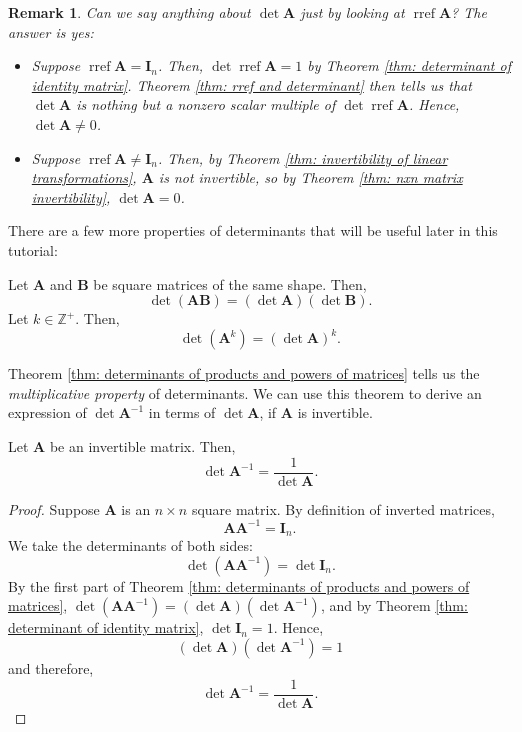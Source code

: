\documentclass[]{book}
\DeclareMathOperator{\rref}{rref}
\newcommand{\mat}[1]{\ensuremath{\mathbf{#1}}}
\newcommand{\idmat}[1][n]{\ensuremath{\mat{I}_#1}}
\newtheorem*{remark}{Remark}
\begin{document}
\begin{remark}
    Can we say anything about $\det\mat{A}$ just by looking at $\rref\mat{A}$? The answer is yes:
    \begin{itemize}
        \item Suppose $\rref\mat{A} = \idmat[n]$. Then, $\det\rref\mat{A} = 1$ by Theorem \ref{thm: determinant of identity matrix}. Theorem \ref{thm: rref and determinant} then tells us that $\det\mat{A}$ is nothing but a nonzero scalar multiple of $\det\rref\mat{A}$. Hence, $\det\mat{A} \neq 0$.
        \item Suppose $\rref\mat{A} \neq \idmat[n]$. Then, by Theorem \ref{thm: invertibility of linear transformations}, $\mat{A}$ is not invertible, so by Theorem \ref{thm: nxn matrix invertibility}, $\det\mat{A} = 0$.
    \end{itemize} 
\end{remark}

There are a few more properties of determinants that will be useful later in this tutorial:

\begin{theorem}
    \label{thm: determinants of products and powers of matrices}
    Let $\mat{A}$ and $\mat{B}$ be square matrices of the same shape. Then,
    \[\det(\mat{A}\mat{B}) = (\det\mat{A})(\det\mat{B}).\]
    Let $k \in \mathbb{Z}^+$. Then,
    \[\det(\mat{A}^k) = (\det\mat{A})^k.\]
\end{theorem}

Theorem \ref{thm: determinants of products and powers of matrices} tells us the \textit{multiplicative property} of determinants. We can use this theorem to derive an expression of $\det\mat{A}^{-1}$ in terms of $\det\mat{A}$, if $\mat{A}$ is invertible.

\begin{theorem}
    \label{thm: determinants of inverted matrices}
    Let $\mat{A}$ be an invertible matrix. Then,
    \[\det\mat{A}^{-1} = \frac{1}{\det\mat{A}}.\]
\begin{proof}
    Suppose $\mat{A}$ is an $n \times n$ square matrix. By definition of inverted matrices, 
    \[\mat{A} \mat{A}^{-1} = \idmat[n].\]
    We take the determinants of both sides:
    \[\det(\mat{A}\mat{A}^{-1}) = \det\idmat[n].\]
    By the first part of Theorem \ref{thm: determinants of products and powers of matrices}, $\det(\mat{A}\mat{A}^{-1}) = (\det\mat{A}) (\det\mat{A}^{-1})$, and by Theorem \ref{thm: determinant of identity matrix}, $\det\idmat[n] = 1$. Hence,
    \[(\det\mat{A}) (\det\mat{A}^{-1}) = 1\]
    and therefore,
    \[\det\mat{A}^{-1} = \frac{1}{\det\mat{A}}.\]
\end{proof}
\end{theorem}
\end{document}
